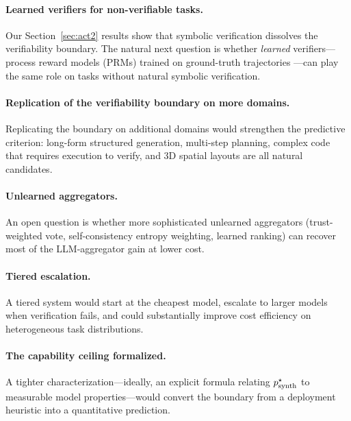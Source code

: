 \documentclass[11pt]{amsart}
\newcommand\1{{\mathds{1}}}
\theoremstyle{definition}
\theoremstyle{remark}
\numberwithin{equation}{section}
\begin{document}
\paragraph{Learned verifiers for non-verifiable tasks.}
Our Section~\ref{sec:act2} results show that symbolic verification dissolves the verifiability boundary.
The natural next question is whether \emph{learned} verifiers---process reward models (PRMs) trained on ground-truth trajectories \cite{Lightman2023PRM}---can play the same role on tasks without natural symbolic verification.

\paragraph{Replication of the verifiability boundary on more domains.}
Replicating the boundary on additional domains would strengthen the predictive criterion: long-form structured generation, multi-step planning, complex code that requires execution to verify, and 3D spatial layouts are all natural candidates.

\paragraph{Unlearned aggregators.}
An open question is whether more sophisticated unlearned aggregators (trust-weighted vote, self-consistency entropy weighting, learned ranking) can recover most of the LLM-aggregator gain at lower cost.

\paragraph{Tiered escalation.}
A tiered system would start at the cheapest model, escalate to larger models when verification fails, and could substantially improve cost efficiency on heterogeneous task distributions.

\paragraph{The capability ceiling formalized.}
A tighter characterization---ideally, an explicit formula relating $p_{\rm synth}^\star$ to measurable model properties---would convert the boundary from a deployment heuristic into a quantitative prediction.
\end{document}

